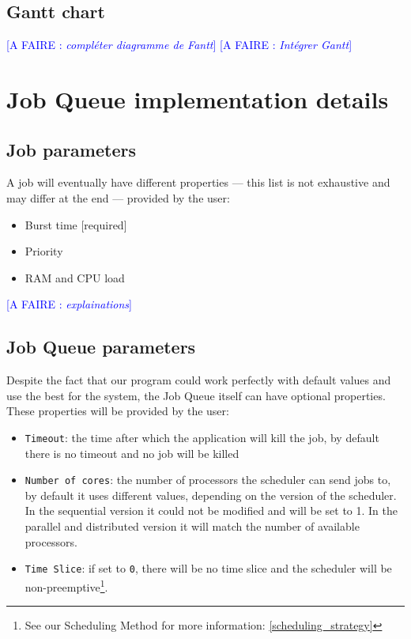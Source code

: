 \documentclass[a4paper,11pt]{article}
\newcommand*{\todo}[1]{\textcolor{blue}{[A FAIRE : \emph{#1}]}}
\begin{document}
\subsection{Gantt chart}

\todo{compléter diagramme de Fantt}
\todo{Intégrer Gantt}


\newpage

\section{Job Queue implementation details}\label{job_queue_implementation_details}

\subsection{Job parameters}\label{job_parameters}

A job will eventually have different properties --- this list is not exhaustive and may differ at the end --- provided by the user:

\begin{itemize}
\item Burst time [required]
\item Priority
\item RAM and CPU load
\end{itemize}

\todo{explainations}

\subsection{Job Queue parameters}

Despite the fact that our program could work perfectly with default values and use the best for the system, the Job Queue itself can have optional properties. These properties will be provided by the user:
\begin{itemize}
\item \texttt{Timeout}: the time after which the application will kill the job, by default there is no timeout and no job will be killed
\item \texttt{Number of cores}: the number of processors the scheduler can send jobs to, by default it uses different values, depending on the version of the scheduler. In the sequential version it could not be modified and will be set to 1. In the parallel and distributed version it will match the number of available processors.
\item \texttt{Time Slice}: if set to \texttt{0}, there will be no time slice and the scheduler will be non-preemptive\footnote{See our Scheduling Method for more information: \ref{scheduling_strategy}}.
\end{itemize}
\end{document}
